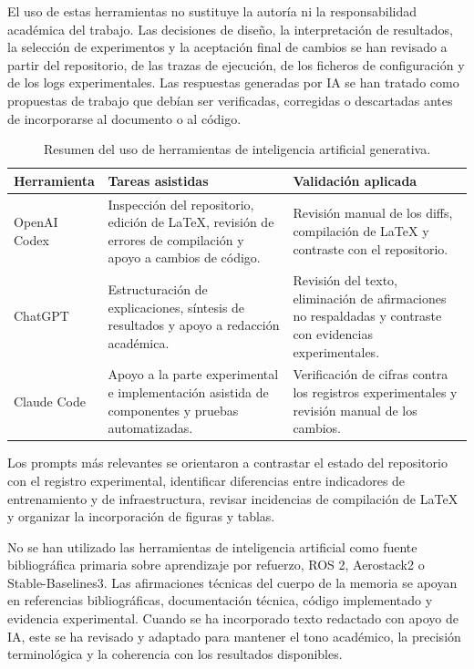 El uso de estas herramientas no sustituye la autoría ni la responsabilidad
académica del trabajo. Las decisiones de diseño, la interpretación de resultados,
la selección de experimentos y la aceptación final de cambios se han revisado a
partir del repositorio, de las trazas de ejecución, de los ficheros de
configuración y de los logs experimentales. Las
respuestas generadas por IA se han tratado como propuestas de trabajo que debían
ser verificadas, corregidas o descartadas antes de incorporarse al documento o al
código.

\begin{table}[H]
\centering
\small
\setlength{\tabcolsep}{4pt}
\renewcommand{\arraystretch}{1.15}
\begin{tabular}{p{} p{} p{}}
\hline
\textbf{Herramienta} & \textbf{Tareas asistidas} & \textbf{Validación aplicada} \\
\hline
OpenAI Codex & Inspección del repositorio, edición de LaTeX, revisión de errores de compilación y apoyo a cambios de código. & Revisión manual de los diffs, compilación de LaTeX y contraste con el repositorio.\\
ChatGPT & Estructuración de explicaciones, síntesis de resultados y apoyo a redacción académica. & Revisión del texto, eliminación de afirmaciones no respaldadas y contraste con evidencias experimentales. \\
Claude Code & Apoyo a la parte experimental e implementación asistida de componentes y pruebas automatizadas. & Verificación de cifras contra los registros experimentales y revisión manual de los cambios. \\
\hline
\end{tabular}
\caption{Resumen del uso de herramientas de inteligencia artificial generativa.}
\label{tab:anexos:uso_ia}
\end{table}

Los prompts más relevantes se orientaron a contrastar el estado del repositorio
con el registro experimental, identificar diferencias entre indicadores de
entrenamiento y de infraestructura, revisar incidencias de compilación de LaTeX
y organizar la incorporación de figuras y tablas.

No se han utilizado las herramientas de inteligencia artificial como fuente
bibliográfica primaria sobre aprendizaje por refuerzo, ROS 2, Aerostack2 o
Stable-Baselines3. Las afirmaciones técnicas del cuerpo de la memoria se apoyan
en referencias bibliográficas, documentación técnica, código implementado y
evidencia experimental. Cuando se ha incorporado texto redactado con apoyo de IA,
este se ha revisado y adaptado para mantener el tono académico, la precisión
terminológica y la coherencia con los resultados disponibles.

